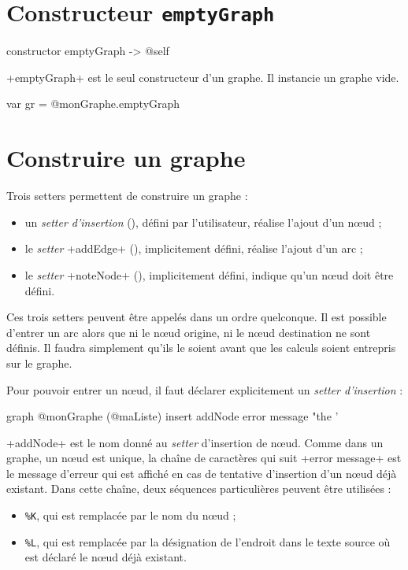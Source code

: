 \section{Constructeur \texttt{emptyGraph}}

\begin{galgas}
constructor emptyGraph -> @self
\end{galgas}

\ggs+emptyGraph+ est le seul constructeur d'un graphe. Il instancie un graphe vide.

\begin{galgas}
var gr = @monGraphe.emptyGraph 
\end{galgas}



\section{Construire un graphe}

Trois setters permettent de construire un graphe :
\begin{itemize}
  \item un \emph{setter d'insertion} (), défini par l'utilisateur, réalise l'ajout d'un nœud ;
  \item le \emph{setter} \ggs+addEdge+ (), implicitement défini, réalise l'ajout d'un arc ;
  \item le \emph{setter} \ggs+noteNode+ (), implicitement défini, indique qu'un nœud doit être défini.
\end{itemize}

Ces trois setters peuvent être appelés dans un ordre quelconque. Il est possible d'entrer un arc alors que ni le nœud origine, ni le nœud destination ne sont définis. Il faudra simplement qu'ils le soient avant que les calculs soient entrepris sur le graphe.


Pour pouvoir entrer un nœud, il faut déclarer explicitement un \emph{setter d'insertion} :
\begin{galgas}
graph @monGraphe (@maListe) {
  insert addNode error message "the '%
}
\end{galgas}

\ggs+addNode+ est le nom donné au \emph{setter} d'insertion de nœud. Comme dans un graphe, un nœud est unique, la chaîne de caractères qui suit \ggs+error message+ est le message d'erreur qui est affiché en cas de tentative d'insertion d'un nœud déjà existant. Dans cette chaîne, deux séquences particulières peuvent être utilisées :
\begin{itemize}
  \item \texttt{\%K}, qui est remplacée par le nom du nœud ;
  \item \texttt{\%L}, qui est remplacée par la désignation de l'endroit dans le texte source où est déclaré le nœud déjà existant.
\end{itemize}


